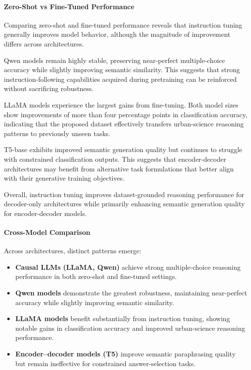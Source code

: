 \documentclass[a4paper,fleqn]{cas-sc}
\begin{document}
\paragraph{Zero-Shot vs Fine-Tuned Performance}

Comparing zero-shot and fine-tuned performance reveals that instruction tuning generally improves model behavior, although the magnitude of improvement differs across architectures.

Qwen models remain highly stable, preserving near-perfect multiple-choice accuracy while slightly improving semantic similarity. This suggests that strong instruction-following capabilities acquired during pretraining can be reinforced without sacrificing robustness.

LLaMA models experience the largest gains from fine-tuning. Both model sizes show improvements of more than four percentage points in classification accuracy, indicating that the proposed dataset effectively transfers urban-science reasoning patterns to previously unseen tasks.

T5-base exhibits improved semantic generation quality but continues to struggle with constrained classification outputs. This suggests that encoder-decoder architectures may benefit from alternative task formulations that better align with their generative training objectives.

Overall, instruction tuning improves dataset-grounded reasoning performance for decoder-only architectures while primarily enhancing semantic generation quality for encoder-decoder models.

\paragraph{Cross-Model Comparison}

Across architectures, distinct patterns emerge:

\begin{itemize}
    \item \textbf{Causal LLMs (LLaMA, Qwen)} achieve strong multiple-choice reasoning performance in both zero-shot and fine-tuned settings.
    
    \item \textbf{Qwen models} demonstrate the greatest robustness, maintaining near-perfect accuracy while slightly improving semantic similarity.
    
    \item \textbf{LLaMA models} benefit substantially from instruction tuning, showing notable gains in classification accuracy and improved urban-science reasoning performance.
    
    \item \textbf{Encoder--decoder models (T5)} improve semantic paraphrasing quality but remain ineffective for constrained answer-selection tasks.
\end{itemize}
\end{document}
